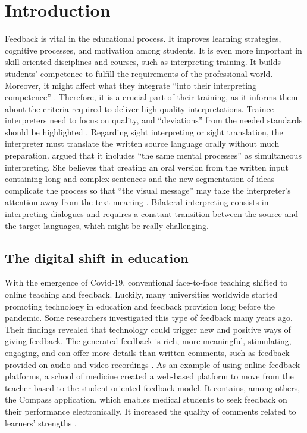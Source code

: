 \documentclass[english]{textolivre}
\begin{document}
\section{Introduction}\label{sec-intro}
Feedback is vital in the educational process. It improves  learning strategies, cognitive processes, and motivation among students. It is even more important in skill-oriented disciplines and courses, such as interpreting training. It builds students’ competence to fulfill the requirements of the professional world. Moreover, it might affect what they integrate “into their interpreting competence” \cite[p.155]{lee_feedback_2018}. Therefore, it is a crucial part of their training, as it informs them about the criteria required to deliver high-quality interpretations. Trainee interpreters need to focus on quality, and “deviations” from the needed standards should be highlighted \cite[p.152-153]{lee_feedback_2018}. Regarding sight interpreting or sight translation, the interpreter must translate the written source language orally without much preparation. \textcite[p. 695]{krapivkina_sight_2018} argued that it includes “the same mental processes” as simultaneous interpreting. She believes that creating an oral version from the written input containing long and complex sentences and the new segmentation of ideas complicate the process so that “the visual message” may take the interpreter’s attention away from the text meaning \cite[p.696]{krapivkina_sight_2018}. Bilateral interpreting consists in interpreting dialogues and requires a constant transition between the source and the target languages, which might be really challenging.

\subsection{The digital shift in education}
With the emergence of Covid-19, conventional face-to-face teaching shifted to online teaching and feedback. Luckily, many universities worldwide started promoting technology in education and feedback provision long before the pandemic. Some researchers investigated this type of feedback many years ago. Their findings revealed that technology could trigger new and positive ways of giving feedback. The generated feedback is rich, more meaningful, stimulating, engaging, and can offer more details than written comments, such as feedback provided on audio and video recordings \cite[p. 1408]{henderson_conditions_2019}. As an example of using online feedback platforms, a school of medicine created a web-based platform to move from the teacher-based to the student-oriented feedback model. It contains, among others, the Compass application, which enables medical students to seek feedback on their performance electronically. It increased the quality of comments related to learners’ strengths \cite[p. 1]{raymond_impact_2019}.
\end{document}
